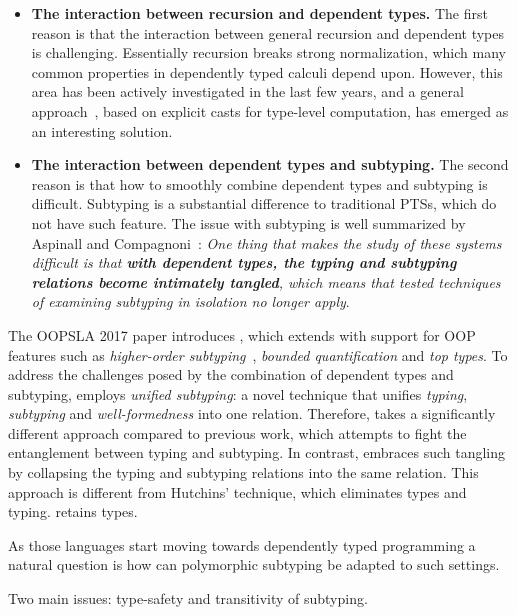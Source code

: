 \begin{itemize}

\item  {\bf The interaction between recursion and dependent types.}
 The first reason is that the
interaction between general recursion and dependent types is
challenging. Essentially recursion breaks strong normalization, which 
many common properties in dependently typed calculi depend upon.
However, this area has been actively investigated in the
last few years, and a general approach~\cite{guru,sjoberg:msfp12, kimmel:plpv, zombie:popl15,
  isotype}, based on explicit 
casts for type-level computation, has emerged as an interesting
solution.

\item {\bf The interaction between dependent types and subtyping.}
The second reason is that how to smoothly combine
dependent types and subtyping is difficult. Subtyping is a
substantial difference to traditional PTSs, which do not have such feature.
The issue with subtyping 
is well summarized by Aspinall and Compagnoni~\cite{subdep}:
\emph{
One thing that makes the study of these systems difficult is that {\bf
  with
dependent types, the typing and subtyping relations become intimately
tangled}, which means that tested techniques of examining subtyping in
isolation no longer apply}.

\end{itemize}

 
The OOPSLA 2017 paper introduces \name, which extends 
\lami with support for OOP features such as
\emph{higher-order subtyping}~\cite{fsubo}, \emph{bounded quantification} and
\emph{top types}. 
To address the challenges posed by
the combination of dependent types and subtyping, \name
employs \emph{unified subtyping}: a novel technique that unifies
\emph{typing}, \emph{subtyping} and \emph{well-formedness} into one
relation. Therefore, \name takes a significantly different
approach compared to previous work, which
attempts to fight the entanglement between typing and subtyping. In
contrast, \name embraces such
tangling by collapsing the typing and subtyping
relations into the same relation.  This approach is different from
Hutchins' technique, which eliminates types and typing. \name
retains types.

As those languages start moving towards dependently typed
programming a natural question is how can polymorphic subtyping be
adapted to such settings.

Two main issues: type-safety and transitivity of subtyping.



